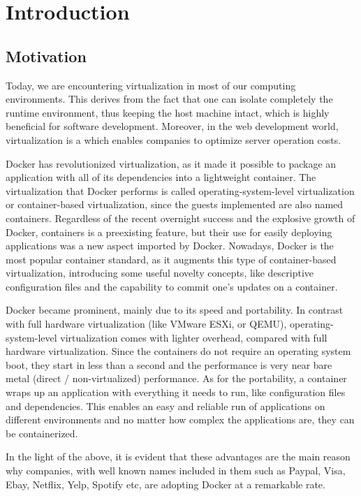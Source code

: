 \chapter{Introduction}

\section{Motivation}

Today, we are encountering virtualization in most of our computing environments. This derives from the fact that one can isolate completely the runtime environment, thus keeping the host machine intact, which is highly beneficial for software development. Moreover, in the web development world, virtualization is a  which enables companies to optimize server operation costs. \cite{virtualdocker}

Docker has revolutionized virtualization, as it made it possible to package an application with all of its dependencies into a lightweight container. The virtualization that Docker performs is called operating-system-level virtualization or container-based virtualization, since the guests implemented are also named containers. Regardless of the recent overnight success and the explosive growth of Docker, containers is a preexisting feature, but their use for easily deploying applications was a new aspect imported by Docker. Nowadays, Docker is the most popular container standard, as it augments this type of container-based virtualization, introducing some useful novelty concepts, like descriptive configuration files and the capability to commit one's updates on a container. 

Docker became prominent, mainly due to its speed and portability. In contrast with full hardware virtualization (like VMware ESXi, or QEMU), operating-system-level virtualization comes with lighter overhead, compared with full hardware virtualization. Since the containers do not require an operating system boot, they start in less than a second and the performance is very near bare metal (direct / non-virtualized) performance. As for the portability, a container wraps up an application with everything it needs to run, like configuration files and dependencies. This enables an easy and reliable run of applications on different environments and no matter how complex the applications are, they can be containerized.
 
In the light of the above, it is evident that these advantages are the main reason why companies, with well known names included in them such as Paypal, Visa, Ebay, Netflix, Yelp, Spotify etc, are adopting Docker at a remarkable rate.

